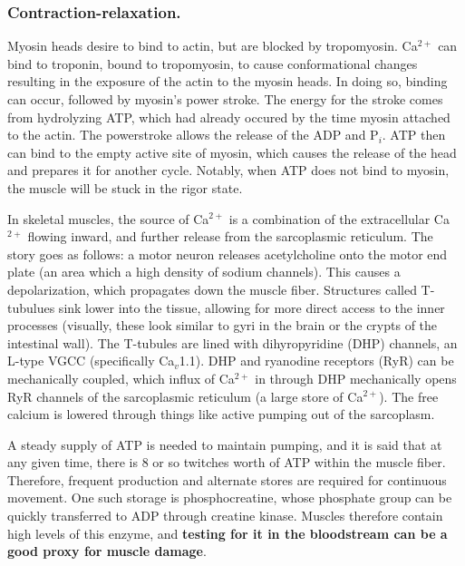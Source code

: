 \documentclass[12pt]{report}
\begin{document}
\subsubsection{Contraction-relaxation.}
Myosin heads desire to bind to actin, but are blocked by tropomyosin. Ca$^{2+}$ can bind to troponin, bound to tropomyosin, to cause conformational changes resulting in the exposure of the actin to the myosin heads. In doing so, binding can occur, followed by myosin's power stroke. The energy for the stroke comes from hydrolyzing ATP, which had already occured by the time myosin attached to the actin. The powerstroke allows the release of the ADP and P$_i$. ATP then can bind to the empty active site of myosin, which causes the release of the head and prepares it for another cycle. Notably, when ATP does not bind to myosin, the muscle will be stuck in the rigor state.\newline

In skeletal muscles, the source of Ca$^{2+}$ is a combination of the extracellular Ca$^{2+}$ flowing inward, and further release from the sarcoplasmic reticulum. The story goes as follows: a motor neuron releases acetylcholine onto the motor end plate (an area which a high density of sodium channels). This causes a depolarization, which propagates down the muscle fiber. Structures called T-tubulues sink lower into the tissue, allowing for more direct access to the inner processes (visually, these look similar to gyri in the brain or the crypts of the intestinal wall). The T-tubules are lined with dihyropyridine (DHP) channels, an L-type VGCC (specifically Ca$_v$1.1). DHP and ryanodine receptors (RyR) can be mechanically coupled, which influx of Ca$^{2+}$ in through DHP mechanically opens RyR channels of the sarcoplasmic reticulum (a large store of Ca$^{2+}$). The free calcium is lowered through things like active pumping out of the sarcoplasm.\newline

A steady supply of ATP is needed to maintain pumping, and it is said that at any given time, there is 8 or so twitches worth of ATP within the muscle fiber. Therefore, frequent production and alternate stores are required for continuous movement. One such storage is phosphocreatine, whose phosphate group can be quickly transferred to ADP through creatine kinase. Muscles therefore contain high levels of this enzyme, and \textbf{testing for it in the bloodstream can be a good proxy for muscle damage}.\newline
\end{document}
